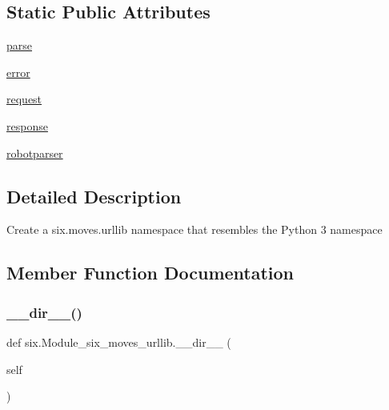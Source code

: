 \subsection*{Static Public Attributes}
\begin{DoxyCompactItemize}
\item 
\hyperlink{classsix_1_1Module__six__moves__urllib_a297da7afa8c7e545c10729acbcee0d7e}{parse}
\item 
\hyperlink{classsix_1_1Module__six__moves__urllib_ae62d99fa26b40db4dc6bd44035da3366}{error}
\item 
\hyperlink{classsix_1_1Module__six__moves__urllib_ad01879ed6d641e8d9b1155f3b31134d2}{request}
\item 
\hyperlink{classsix_1_1Module__six__moves__urllib_aed88e052724012eaa5f6cc8e02153379}{response}
\item 
\hyperlink{classsix_1_1Module__six__moves__urllib_aac7f36892f328cd15d85d3569a2664c4}{robotparser}
\end{DoxyCompactItemize}


\subsection{Detailed Description}
\begin{DoxyVerb}Create a six.moves.urllib namespace that resembles the Python 3 namespace\end{DoxyVerb}
 

\subsection{Member Function Documentation}
\mbox{\label{classsix_1_1Module__six__moves__urllib_ae77be536edde9596744e3e44be72154d}} 
\subsubsection{\texorpdfstring{\+\_\+\+\_\+dir\+\_\+\+\_\+()}{\_\_dir\_\_()}}
{\footnotesize\ttfamily def six.\+Module\+\_\+six\+\_\+moves\+\_\+urllib.\+\_\+\+\_\+dir\+\_\+\+\_\+ (\begin{DoxyParamCaption}\item[{}]{self }\end{DoxyParamCaption})}



